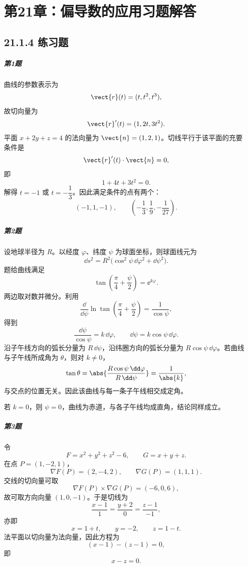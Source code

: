 \chapter*{第21章：偏导数的应用习题解答}
\section*{21.1.4 练习题}

\paragraph{第1题}
\begin{xsolution}
曲线的参数表示为
\[
  \vect{r}(t)=(t,t^2,t^3),
\]
故切向量为
\[
  \vect{r}'(t)=(1,2t,3t^2).
\]
平面 $x+2y+z=4$ 的法向量为 $\vect{n}=(1,2,1)$。切线平行于该平面的充要条件是
\[
  \vect{r}'(t)\cdot\vect{n}=0,
\]
即
\[
  1+4t+3t^2=0.
\]
解得 $t=-1$ 或 $t=-\dfrac13$。因此满足条件的点有两个：
\[
  (-1,1,-1),
  \qquad
  \left(-\frac13,\frac19,-\frac1{27}\right).
\]
\end{xsolution}

\paragraph{第2题}
\begin{xsolution}
设地球半径为 $R$。以经度 $\varphi$、纬度 $\psi$ 为球面坐标，则球面线元为
\[
  \dd s^2=R^2\bigl(\cos^2\psi\,\dd\varphi^2+\dd\psi^2\bigr).
\]
题给曲线满足
\[
  \tan\left(\frac\pi4+\frac\psi2\right)=\ee^{k\varphi}.
\]
两边取对数并微分。利用
\[
  \frac{\dd}{\dd\psi}
  \ln\tan\left(\frac\pi4+\frac\psi2\right)
  =\frac1{\cos\psi},
\]
得到
\[
  \frac{\dd\psi}{\cos\psi}=k\,\dd\varphi,
  \qquad
  \dd\psi=k\cos\psi\,\dd\varphi.
\]
沿子午线方向的弧长分量为 $R\,\dd\psi$，沿纬圈方向的弧长分量为 $R\cos\psi\,\dd\varphi$。若曲线与子午线所成角为 $\theta$，则对 $k\ne0$，
\[
  \tan\theta
  =\abs{\frac{R\cos\psi\,\dd\varphi}{R\,\dd\psi}}
  =\frac1{\abs{k}},
\]
与交点的位置无关。因此该曲线与每一条子午线相交成定角。

若 $k=0$，则 $\psi=0$，曲线为赤道，与各子午线均成直角，结论同样成立。
\end{xsolution}

\paragraph{第3题}
\begin{xsolution}
令
\[
  F=x^2+y^2+z^2-6,
  \qquad
  G=x+y+z.
\]
在点 $P=(1,-2,1)$，
\[
  \nabla F(P)=(2,-4,2),
  \qquad
  \nabla G(P)=(1,1,1).
\]
交线的切向量可取
\[
  \nabla F(P)\times\nabla G(P)=(-6,0,6),
\]
故可取方向向量 $(1,0,-1)$。于是切线为
\[
  \frac{x-1}{1}=\frac{y+2}{0}=\frac{z-1}{-1},
\]
亦即
\[
  x=1+t,\qquad y=-2,\qquad z=1-t.
\]
法平面以切向量为法向量，因此方程为
\[
  (x-1)-(z-1)=0,
\]
即
\[
  x-z=0.
\]
\end{xsolution}

